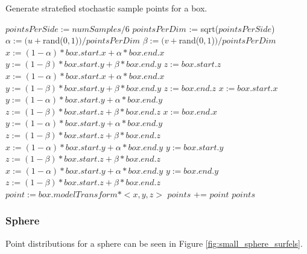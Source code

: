 \begin{algorithm}
\captionfont
\caption[Box point generation]{Generate stratefied stochastic sample points for a box.}
\label{alg:box_point_gen}
{\fontsize{10}{9}\selectfont
\begin{algorithmic}
      \State $pointsPerSide := numSamples / 6$
      \State $pointsPerDim$ := sqrt($pointsPerSide$)
               \State $\alpha := (u + $rand($0,1$)$) / pointsPerDim$
               \State $\beta := (v + $rand($0,1$)$) / pointsPerDim$
                  \State $x := (1-\alpha) * box.start.x + \alpha * box.end.x$
                  \State $y := (1-\beta) * box.start.y + \beta * box.end.y$
                  \State $z := box.start.z$
                  \State $x := (1-\alpha) * box.start.x + \alpha * box.end.x$
                  \State $y := (1-\beta) * box.start.y + \beta * box.end.y$
                  \State $z := box.end.z$
                  \State $x := box.start.x$
                  \State $y := (1-\alpha) * box.start.y + \alpha * box.end.y$
                  \State $z := (1-\beta) * box.start.z + \beta * box.end.z$
                  \State $x := box.end.x$
                  \State $y := (1-\alpha) * box.start.y + \alpha * box.end.y$
                  \State $z := (1-\beta) * box.start.z + \beta * box.end.z$
                  \State $x := (1-\alpha) * box.start.y + \alpha * box.end.y$
                  \State $y := box.start.y$
                  \State $z := (1-\beta) * box.start.z + \beta * box.end.z$
                  \State $x := (1-\alpha) * box.start.y + \alpha * box.end.y$
                  \State $y := box.end.y$
                  \State $z := (1-\beta) * box.start.z + \beta * box.end.z$
               \EndIf
               \State $point := box.modelTransform * <x, y, z>$
               \State $points$ += $point$
            \EndFor
         \EndFor
      \EndFor
      \State \Return $points$
   \EndFunction
\end{algorithmic}
}
\end{algorithm}

\subsubsection{Sphere}
\label{sec:sphere_point_gen}
Point distributions for a sphere can be seen in Figure \ref{fig:small_sphere_surfels}.

